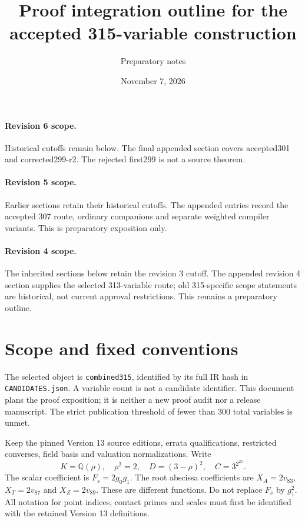 \documentclass{article}
\begin{document}
\paragraph{Revision 6 scope.} Historical cutoffs remain below. The final appended section covers accepted301 and corrected299-r2. The rejected first299 is not a source theorem.

\paragraph{Revision 5 scope.} Earlier sections retain their historical cutoffs. The appended entries record the accepted 307 route, ordinary companions and separate weighted compiler variants. This is preparatory exposition only.

\paragraph{Revision 4 scope.} The inherited sections below retain the revision 3 cutoff. The appended revision 4 section supplies the selected 313-variable route; old 315-specific scope statements are historical, not current approval restrictions. This remains a preparatory outline.

\title{Proof integration outline for the accepted 315-variable construction}
\author{Preparatory notes}
\date{November 7, 2026}
\maketitle

\section{Scope and fixed conventions}\label{outline:scope}
The selected object is \texttt{combined315}, identified by its full IR hash
in \texttt{CANDIDATES.json}. A variable count is not a candidate identifier.
This document plans the proof exposition; it is neither a new proof audit
nor a release manuscript. The strict publication threshold of fewer than
300 total variables is unmet.

Keep the pinned Version 13 source editions, errata qualifications, restricted
converses, field basis and valuation normalizations. Write
\[
 K=\mathbb Q(\rho),\quad \rho^2=2,\quad D=(3-\rho)^2,
 \quad C=3^{2^{25}}.
\]
The scalar coefficient is $F_s=2g_0g_1$. The root abscissa coefficients
are $X_A=2v_{83}$, $X_T=2v_{87}$ and $X_Z=2v_{89}$.
These are different functions. Do not replace $F_s$ by $g_1^2$.
All notation for point indices, contact primes and scales must first be
identified with the retained Version 13 definitions.
\end{document}
